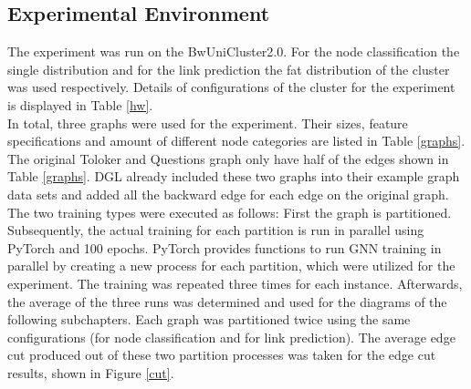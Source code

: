 \documentclass[acmsmall,nonacm,screen,review]{acmart}
\begin{document}
\subsection{Experimental Environment}
The experiment was run on the BwUniCluster2.0. For the node classification the single distribution and for the link prediction the fat distribution of the cluster was used respectively. Details of configurations of the cluster for the experiment is displayed in Table \ref{hw}.\\
In total, three graphs were used for the experiment. Their sizes, feature specifications and amount of different node categories are listed in Table \ref{graphs}. The original Toloker and Questions graph only have half of the edges shown in Table \ref{graphs}. DGL already included these two graphs into their example graph data sets and added all the backward edge for each edge on the original graph.\\
The two training types were executed as follows: First the graph is partitioned. Subsequently, the actual training for each partition is run in parallel using PyTorch \cite{PyTorch} and 100 epochs. PyTorch provides functions to run GNN training in parallel by creating a new process for each partition, which were utilized for the experiment. The training was repeated three times for each instance. Afterwards, the average of the three runs was determined and used for the diagrams of the following subchapters. Each graph was partitioned twice using the same configurations (for node classification and for link prediction). The average edge cut produced out of these two partition processes was taken for the edge cut results, shown in Figure \ref{cut}.
\end{document}
